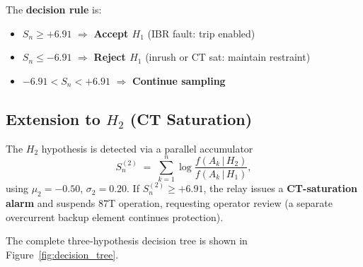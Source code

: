 \documentclass[11pt, a4paper]{article}
\newcommand{\Ak}{A_k}
\newcommand{\Sn}{S_n}
\begin{document}
The \textbf{decision rule} is:
\begin{itemize}
  \item $\Sn \geq +6.91$ $\Rightarrow$ \textbf{Accept $H_1$} (IBR fault: trip enabled)
  \item $\Sn \leq -6.91$ $\Rightarrow$ \textbf{Reject $H_1$} (inrush or CT sat: maintain restraint)
  \item $-6.91 < \Sn < +6.91$ $\Rightarrow$ \textbf{Continue sampling}
\end{itemize}

\subsection{Extension to $H_2$ (CT Saturation)}

The $H_2$ hypothesis is detected via a parallel accumulator
\begin{equation}
  \Sn^{(2)} \;=\; \sum_{k=1}^{n} \log \frac{f(\Ak\,|\,H_2)}{f(\Ak\,|\,H_1)},
  \label{eq:Sn2}
\end{equation}
using $\mu_2 = -0.50$, $\sigma_2 = 0.20$.  If $S_n^{(2)} \geq +6.91$, the relay
issues a \textbf{CT-saturation alarm} and suspends 87T operation, requesting
operator review (a separate overcurrent backup element continues protection).

The complete three-hypothesis decision tree is shown in
Figure~\ref{fig:decision_tree}.
\end{document}

